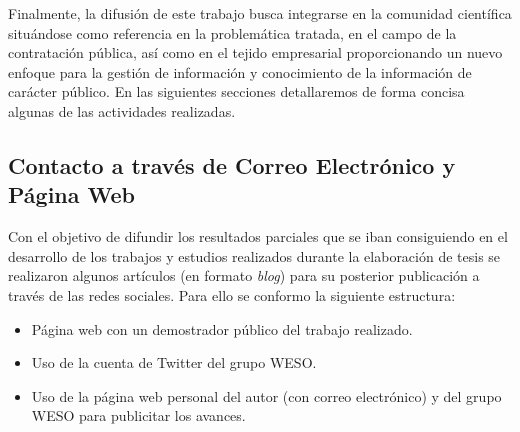 Finalmente, la difusión de este trabajo busca integrarse en la comunidad científica situándose como referencia en
la problemática tratada, \lod en el campo de la contratación pública, así como en el tejido empresarial proporcionando un nuevo
enfoque para la gestión de información y conocimiento de la información de carácter público. En las siguientes secciones detallaremos
de forma concisa algunas de las actividades realizadas.

\subsection{Contacto a través de Correo Electrónico y Página Web}
Con el objetivo de difundir los resultados parciales que se iban consiguiendo en el desarrollo
de los trabajos y estudios realizados durante la elaboración de tesis se realizaron
algunos artículos (en formato \textit{blog}) para su posterior publicación
a través de las redes sociales. Para ello se conformo la siguiente estructura:
\begin{itemize}
 \item Página web con un demostrador público del trabajo realizado.
 \item Uso de la cuenta de Twitter del grupo \gls{WESO}.
 \item Uso de la página web personal del autor (con correo electrónico) y del grupo WESO para publicitar los avances.
\end{itemize}


